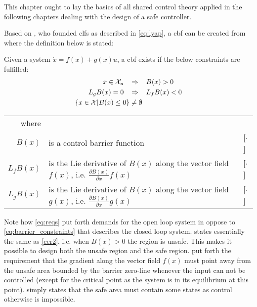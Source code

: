 This chapter ought to lay the basics of all shared control theory applied in the following chapters dealing with the design of a safe controller.

Based on \citep{bib:artstein}, who founded \glspl{clf} as described in \autoref{eq:lyap}, a \gls{cbf} can be created \citep{bib:org_control} from where the definition below is stated:
\begin{defn}
Given a system $\dot{x}=f(x)+g(x)u$, a \gls{cbf} exists if the below constraints are fulfilled:
\begin{subequations}\label{eq:reqs}
\begin{flalign}
x\in \mathcal{X}_u \hspace{0.3cm} &\Rightarrow \hspace{0.3cm} B(x) > 0  \label{req1} \\
L_gB(x) = 0 \hspace{0.3cm} &\Rightarrow \hspace{0.3cm} L_fB(x) < 0 \label{req2} \\
\{ x \in \mathcal{X} | B(x) \leq 0 \} &\neq \emptyset \label{req3}
\end{flalign}
\end{subequations}
\vspace{-0.6cm}
\begin{tabular}{r l l} 
where  & & \\
$B(x)$ & is a control barrier function & [$\cdot$] \\ 
$L_fB(x)$ & is the Lie derivative of $B(x)$ along the vector field  $f(x)$, i.e. $\frac{\partial B(x)}{\partial x}f(x)$ & [$\cdot$] \\ 
$L_gB(x)$ & is the Lie derivative of $B(x)$ along the vector field  $g(x)$, i.e. $\frac{\partial B(x)}{\partial x}g(x)$ & [$\cdot$] 
\end{tabular}
\vspace*{0.2cm}
\end{defn}
Note how \autoref{eq:reqs} put forth demands for the open loop system in oppose to \autoref{eq:barrier_constraints} that describes the closed loop system.  states essentially the same as \autoref{cer2}, i.e. when $B(x)>0$ the region is unsafe. This makes it possible to design both the unsafe region and the safe region.  put forth the requirement that the gradient along the vector field $f(x)$ must point away from the unsafe area bounded by the barrier zero-line whenever the input can not be controlled (except for the critical point as the system is in its equilibrium at this point).  simply states that the safe area must contain some states as control otherwise is impossible.
%
